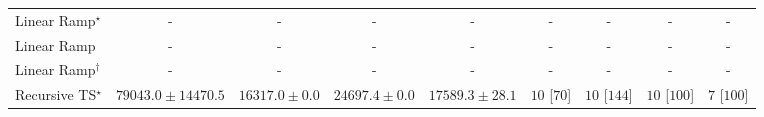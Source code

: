 \begin{tabular}{l|cccc|cccc|}
Linear Ramp$^\star$ & {\cellcolor[HTML]{000000}} \color[HTML]{F1F1F1} {\cellcolor{white}} \color{black} - & {\cellcolor[HTML]{000000}} \color[HTML]{F1F1F1} {\cellcolor{white}} \color{black} - & {\cellcolor[HTML]{000000}} \color[HTML]{F1F1F1} {\cellcolor{white}} \color{black} - & {\cellcolor[HTML]{000000}} \color[HTML]{F1F1F1} {\cellcolor{white}} \color{black} - & {\cellcolor[HTML]{000000}} \color[HTML]{F1F1F1} {\cellcolor{white}} \color{black} - & {\cellcolor[HTML]{000000}} \color[HTML]{F1F1F1} {\cellcolor{white}} \color{black} - & {\cellcolor[HTML]{000000}} \color[HTML]{F1F1F1} {\cellcolor{white}} \color{black} - & {\cellcolor[HTML]{000000}} \color[HTML]{F1F1F1} {\cellcolor{white}} \color{black} - \\
Linear Ramp & {\cellcolor[HTML]{000000}} \color[HTML]{F1F1F1} {\cellcolor{white}} \color{black} - & {\cellcolor[HTML]{000000}} \color[HTML]{F1F1F1} {\cellcolor{white}} \color{black} - & {\cellcolor[HTML]{000000}} \color[HTML]{F1F1F1} {\cellcolor{white}} \color{black} - & {\cellcolor[HTML]{000000}} \color[HTML]{F1F1F1} {\cellcolor{white}} \color{black} - & {\cellcolor[HTML]{000000}} \color[HTML]{F1F1F1} {\cellcolor{white}} \color{black} - & {\cellcolor[HTML]{000000}} \color[HTML]{F1F1F1} {\cellcolor{white}} \color{black} - & {\cellcolor[HTML]{000000}} \color[HTML]{F1F1F1} {\cellcolor{white}} \color{black} - & {\cellcolor[HTML]{000000}} \color[HTML]{F1F1F1} {\cellcolor{white}} \color{black} - \\
Linear Ramp$^\dagger$ & {\cellcolor[HTML]{000000}} \color[HTML]{F1F1F1} {\cellcolor{white}} \color{black} - & {\cellcolor[HTML]{000000}} \color[HTML]{F1F1F1} {\cellcolor{white}} \color{black} - & {\cellcolor[HTML]{000000}} \color[HTML]{F1F1F1} {\cellcolor{white}} \color{black} - & {\cellcolor[HTML]{000000}} \color[HTML]{F1F1F1} {\cellcolor{white}} \color{black} - & {\cellcolor[HTML]{000000}} \color[HTML]{F1F1F1} {\cellcolor{white}} \color{black} - & {\cellcolor[HTML]{000000}} \color[HTML]{F1F1F1} {\cellcolor{white}} \color{black} - & {\cellcolor[HTML]{000000}} \color[HTML]{F1F1F1} {\cellcolor{white}} \color{black} - & {\cellcolor[HTML]{000000}} \color[HTML]{F1F1F1} {\cellcolor{white}} \color{black} - \\
Recursive TS$^\star$ & {\cellcolor[HTML]{00472A}} \color[HTML]{F1F1F1} $79043.0\pm 14470.5$ & {\cellcolor[HTML]{FCFED6}} \color[HTML]{000000} $16317.0\pm 0.0$ & {\cellcolor[HTML]{EDF8B1}} \color[HTML]{000000} $24697.4\pm 0.0$ & {\cellcolor[HTML]{FBFDCF}} \color[HTML]{000000} $17589.3\pm 28.1$ & {\cellcolor[HTML]{49006A}} \color[HTML]{F1F1F1} $10$ [$70$] & {\cellcolor[HTML]{49006A}} \color[HTML]{F1F1F1} $10$ [$144$] & {\cellcolor[HTML]{49006A}} \color[HTML]{F1F1F1} $10$ [$100$] & {\cellcolor[HTML]{CD238F}} \color[HTML]{F1F1F1} $7$ [$100$] \\

\end{tabular}

